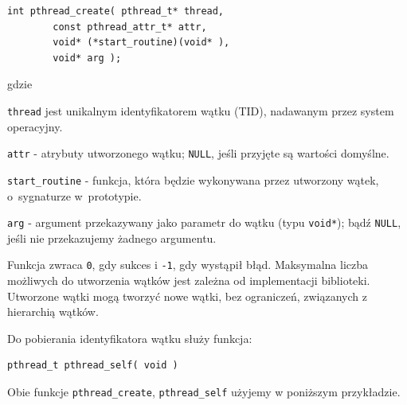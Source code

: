\begin{lstlisting}[style=MyCStyle]
int pthread_create( pthread_t* thread,
		const pthread_attr_t* attr,
		void* (*start_routine)(void* ),
		void* arg );
\end{lstlisting}

gdzie

\begin{myitemize}
\item \lstinline[style=MyCStyle]{thread} jest unikalnym identyfikatorem wątku (TID), nadawanym przez system operacyjny.
\item \lstinline[style=MyCStyle]{attr} - atrybuty utworzonego wątku; \lstinline[style=MyCStyle]{NULL}, jeśli przyjęte są wartości domyślne.
\item \lstinline[style=MyCStyle]{start_routine} - funkcja, która będzie wykonywana przez utworzony wątek, o~sygnaturze w~prototypie.
\item \lstinline[style=MyCStyle]{arg} - argument przekazywany jako parametr do wątku (typu \lstinline[style=MyCStyle]{void*}); bądź \lstinline[style=MyCStyle]{NULL}, jeśli nie przekazujemy żadnego argumentu. 
\end{myitemize}

Funkcja zwraca \lstinline[style=MyCStyle]{0}, gdy sukces i \lstinline[style=MyCStyle]{-1}, gdy wystąpił błąd. Maksymalna liczba możliwych do utworzenia wątków jest zależna od implementacji biblioteki. Utworzone wątki mogą tworzyć nowe wątki, bez ograniczeń, związanych z hierarchią wątków. 

Do pobierania identyfikatora wątku służy funkcja:

\begin{lstlisting}[style=MyCStyle]
pthread_t pthread_self( void )
\end{lstlisting}

Obie funkcje \lstinline[style=MyCStyle]{pthread_create}, \lstinline[style=MyCStyle]{pthread_self} użyjemy w poniższym przykładzie.  

